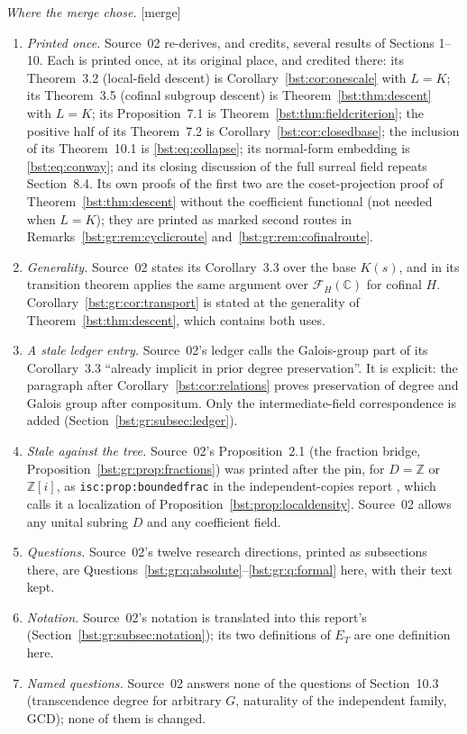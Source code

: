 \documentclass[11pt,letterpaper]{article}
\theoremstyle{definition}
\theoremstyle{remark}
\newcommand{\C}{\mathbb C}
\newcommand{\Z}{\mathbb Z}
\newcommand{\FF}[2]{\mathcal F_{#2}(#1)}
\begin{document}
\emph{Where the merge chose.} \textup{[merge]}
\begin{enumerate}
\item \emph{Printed once.} Source~02 re-derives, and credits, several
results of Sections 1--10. Each is printed once, at its original place, and
credited there: its Theorem~3.2 (local-field descent) is
Corollary~\ref{bst:cor:onescale} with $L=K$; its Theorem~3.5 (cofinal
subgroup descent) is Theorem~\ref{bst:thm:descent} with $L=K$; its
Proposition~7.1 is Theorem~\ref{bst:thm:fieldcriterion}; the positive half
of its Theorem~7.2 is Corollary~\ref{bst:cor:closedbase}; the inclusion of
its Theorem~10.1 is \eqref{bst:eq:collapse}; its normal-form embedding is
\eqref{bst:eq:conway}; and its closing discussion of the full surreal field
repeats Section~8.4. Its own proofs of the first two are the coset-projection
proof of Theorem~\ref{bst:thm:descent} without the coefficient functional
(not needed when $L=K$); they are printed as marked second routes in
Remarks~\ref{bst:gr:rem:cyclicroute} and~\ref{bst:gr:rem:cofinalroute}.
\item \emph{Generality.} Source~02 states its Corollary~3.3 over the base
$K(s)$, and in its transition theorem applies the same argument over
$\FF{\C}H$ for cofinal $H$. Corollary~\ref{bst:gr:cor:transport} is stated at
the generality of Theorem~\ref{bst:thm:descent}, which contains both uses.
\item \emph{A stale ledger entry.} Source~02's ledger calls the Galois-group
part of its Corollary~3.3 ``already implicit in prior degree preservation''.
It is explicit: the paragraph after Corollary~\ref{bst:cor:relations} proves
preservation of degree and Galois group after compositum. Only the
intermediate-field correspondence is added (Section~\ref{bst:gr:subsec:ledger}).
\item \emph{Stale against the tree.} Source~02's Proposition~2.1 (the
fraction bridge, Proposition~\ref{bst:gr:prop:fractions}) was printed after the
pin, for $D=\Z$ or $\Z[i]$, as \texttt{isc:prop:boundedfrac} in the
independent-copies report \cite{RepoIsc}, which calls it a localization of
Proposition~\ref{bst:prop:localdensity}. Source~02 allows any unital subring
$D$ and any coefficient field.
\item \emph{Questions.} Source~02's twelve research directions, printed as
subsections there, are Questions~\ref{bst:gr:q:absolute}--\ref{bst:gr:q:formal}
here, with their text kept.
\item \emph{Notation.} Source~02's notation is translated into this report's
(Section~\ref{bst:gr:subsec:notation}); its two definitions of $E_T$ are one
definition here.
\item \emph{Named questions.} Source~02 answers none of the questions of
Section~10.3 (transcendence degree for arbitrary $G$, naturality of the
independent family, GCD); none of them is changed.
\end{enumerate}
\end{document}
